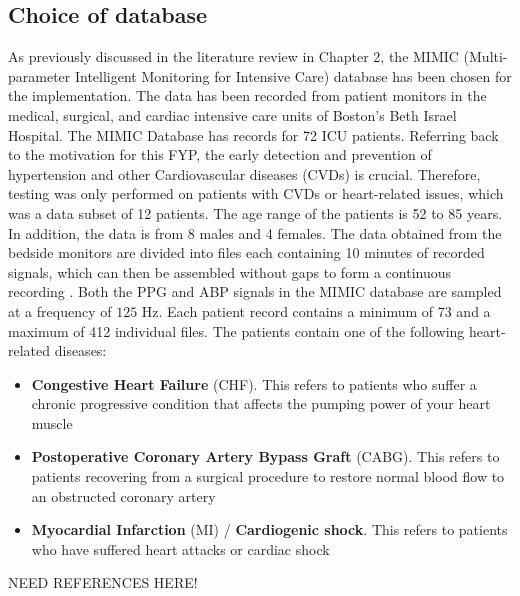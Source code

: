 \subsection{Choice of database}
As previously discussed in the literature review in Chapter 2, the 
MIMIC (Multi-parameter Intelligent Monitoring for Intensive Care) database has been chosen 
for the implementation. The data has been recorded from patient monitors in the medical, 
surgical, and cardiac intensive care units of Boston's Beth Israel Hospital. The MIMIC Database 
has records for 72 ICU patients. Referring back to the motivation for this FYP, the early detection and prevention of hypertension and other Cardiovascular diseases (CVDs) is 
crucial. Therefore, testing was only performed on patients with CVDs or heart-related issues, which was a data subset of 12 patients. The age range of the patients 
is 52 to 85 years. In addition, the data is from 8 males and 4 females. The data obtained from the bedside monitors are divided into files 
each containing 10 minutes of recorded signals, which can then be assembled without 
gaps to form a continuous recording \cite{Moody1996}. Both the PPG and ABP signals in the MIMIC database 
are sampled at a frequency of $125$ Hz. Each patient record contains a minimum of 73 and a maximum of 412 individual files.
 The patients contain one of the following heart-related diseases:
\begin{itemize}
    \item \textbf{Congestive Heart Failure} (CHF). This refers to patients who suffer a chronic progressive condition that affects the pumping power of your heart muscle
    \item \textbf{Postoperative Coronary Artery Bypass Graft} (CABG). This refers to patients recovering from a surgical procedure to restore normal blood flow to an obstructed coronary artery
    \item \textbf{Myocardial Infarction} (MI) / \textbf{Cardiogenic shock}. This refers to patients who have suffered heart attacks or cardiac shock
\end{itemize}NEED REFERENCES HERE!


